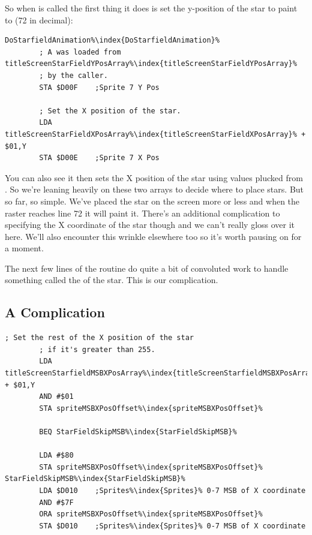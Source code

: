 So when  is called the first thing it does is set the y-position of the star to paint
to  (72 in decimal): 

\begin{lstlisting}[caption=The start of \icode{DoStarfieldAnimation\index{DoStarfieldAnimation}} responsible for painting stars.,escapechar=\%]
DoStarfieldAnimation%\index{DoStarfieldAnimation}%   
        ; A was loaded from titleScreenStarFieldYPosArray%\index{titleScreenStarFieldYPosArray}%
        ; by the caller.
        STA $D00F    ;Sprite 7 Y Pos

        ; Set the X position of the star.
        LDA titleScreenStarFieldXPosArray%\index{titleScreenStarFieldXPosArray}% + $01,Y
        STA $D00E    ;Sprite 7 X Pos

\end{lstlisting}

You can also see it then sets the X position of the star using values plucked from .
So we're leaning heavily on these two arrays to decide where to place stars. But so far, so simple. We've placed the star
on the screen more or less and when the raster reaches line 72 it will paint it. There's an additional complication to 
specifying the X coordinate of the star though and we can't really gloss over it here. We'll also encounter this
wrinkle elsewhere too so it's worth pausing on for a moment.

The next few lines of the routine do quite a bit of convoluted work to handle something called the  of the
star. This is our complication. 

\subsection{A Complication}
\begin{lstlisting}[caption= MSBXPos.. some'it.,escapechar=\%]
        ; Set the rest of the X position of the star
        ; if it's greater than 255.
        LDA titleScreenStarfieldMSBXPosArray%\index{titleScreenStarfieldMSBXPosArray}% + $01,Y
        AND #$01
        STA spriteMSBXPosOffset%\index{spriteMSBXPosOffset}%

        BEQ StarFieldSkipMSB%\index{StarFieldSkipMSB}%

        LDA #$80
        STA spriteMSBXPosOffset%\index{spriteMSBXPosOffset}%
StarFieldSkipMSB%\index{StarFieldSkipMSB}%   
        LDA $D010    ;Sprites%\index{Sprites}% 0-7 MSB of X coordinate
        AND #$7F
        ORA spriteMSBXPosOffset%\index{spriteMSBXPosOffset}%
        STA $D010    ;Sprites%\index{Sprites}% 0-7 MSB of X coordinate

\end{lstlisting}

